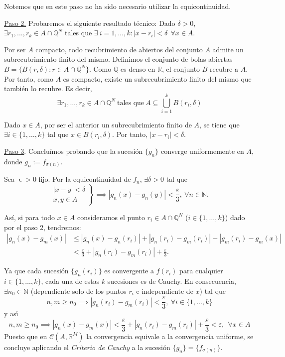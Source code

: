 \documentclass[11pt, a4paper]{article}
\makeatletter
\newif\IfInSansMode
\let\oldsf\sffamily
\renewcommand*{\sffamily}{\oldsf\mathversion{sans}\InSansModetrue}
\let\oldnorm\normalfont
\renewcommand*{\normalfont}{\oldnorm\InSansModefalse\mathversion{normal}}
\let\epsilon\upvarepsilon
\renewenvironment{proof}[1][\proofname] {\par\pushQED{\qed}\normalfont\topsep6\p@\@plus6\p@\relax\trivlist\item[\hskip\labelsep\itshape\sffamily#1\@addpunct{.}]\ignorespaces}{\popQED\endtrivlist\@endpefalse}
\theoremstyle{theorem-style}
\theoremstyle{definition-style}
\theoremstyle{remark-style}
\theoremstyle{example-style}
\makeatother
\begin{document}
\begin{proof}
    Notemos que en este paso no ha sido necesario utilizar la equicontinuidad.

    \underline{Paso 2.} Probaremos el siguiente resultado técnico: Dado $\delta>0$, $\exists r_1,...,r_k \in A \cap \mathbb Q^N$ tales que $\exists \ i=1,...,k : |x-r_i| < \delta \ \ \forall x \in A$.

    Por ser $A$ compacto, todo recubrimiento de abiertos del conjunto $A$ admite un subrecubrimiento finito del mismo. Definimos el conjunto de bolas abiertas $B=\{B(r,\delta) : r \in A\cap \mathbb Q^N \}$. Como $\mathbb{Q}$ es denso en $\mathbb{R}$, el conjunto $B$ recubre a $A$. Por tanto, como $A$ es compacto, existe un subrecubrimiento finito del mismo que también lo recubre. Es decir, $$\exists r_1,\dots, r_k \in A\cap \mathbb Q^N \ \text{tales que} \ A \subseteq \bigcup_{i=1}^k B(r_i,\delta)$$
    
    Dado $x \in A$, por ser el anterior un subrecubrimiento finito de $A$, se tiene que\\ $\exists i \in \{1,\dots,k\}$ tal que $x \in B(r_i,\delta)$. Por tanto, $|x-r_i| <\delta$.

    \underline{Paso 3}. Concluímos probando que la sucesión $\{g_n\}$ converge uniformemente en $A$, donde $g_n := f_{\sigma(n)}$.

    Sea $\epsilon>0$ fijo. Por la equicontinuidad de $f_n$, 
    $\exists\delta>0$ tal que
    \[
      \left.
        \begin{array}{c}
          |x-y| <\delta
          \\
          x,y\in A
        \end{array}
      \right\}
      \implies |g_n(x)-g_n(y)|<\frac{\varepsilon}{3} , \ \forall n\in\mathbb N.
    \]

    Así, si para todo $x\in A$ consideramos el punto  $r_i\in A\cap \mathbb Q^N$ ($i \in \{1,\dots,k\}$) dado por el paso 2, tendremos:
    \[
      \begin{aligned}
        |g_n(x)-g_m(x)| &\leq |g_n(x)-g_n(r_i)| + |g_n(r_i)-g_m(r_i)|+|g_m(r_i)-g_m(x)|
        \\
        &<\frac{\varepsilon}{3} +|g_n(r_i)-g_m(r_i)| 
        + \frac{\varepsilon}{3} .
      \end{aligned}
    \]



    Ya que cada sucesi\'on $\{ g_n(r_i)\}$ es convergente a $f(r_i)$ para cualquier $i\in \{ 1,\dots ,k\}$, cada una de estas $k$ sucesiones  es de Cauchy. En consecuencia, $\exists n_0\in\mathbb N$ ({dependiente solo de los puntos $r_i$ e independiente de $x$}) tal que
    \[
      n,m\geq n_0 \implies |g_n(r_i)-g_m(r_i)| <\frac{\varepsilon}{3} , \ \forall i\in \{ 1,\dots ,k\}
    \]
    y as\'{\i}
    \[
      n,m\geq n_0 \implies |g_n(x)-g_m(x)| <\frac{\varepsilon}{3} +|g_n(r_i)-g_m(r_i)| 
      + \frac{\varepsilon}{3} <\varepsilon , \ \ \forall x\in A
    \]
    Puesto que en $\mathcal{C}(A,\mathbb R^M )$ la convergencia equivale a la convergencia uniforme, se concluye aplicando el \textit{Criterio de Cauchy} a la sucesión $\{g_n\} = \{f_{\sigma(n)}\}$.
  \end{proof}
\end{document}
